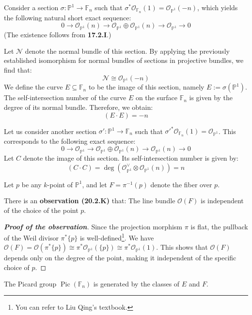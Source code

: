 Consider a section $\sigma: \mathbb{P}^1 \to \mathbb{F}_n$ such that $\sigma^*\mathcal{O}_{\mathbb{F}_n}(1) = \mathcal{O}_{\mathbb{P}^1}(-n)$, which yields the following natural short exact sequence:
\[
0 \to \mathcal{O}_{\mathbb{P}^1}(n) \to \mathcal{O}_{\mathbb{P}^1} \oplus \mathcal{O}_{\mathbb{P}^1}(n) \to \mathcal{O}_{\mathbb{P}^1} \to 0
\]
(The existence follows from \textbf{17.2.I}.)

Let $\mathcal{N}$ denote the normal bundle of this section. By applying the previously established isomorphism for normal bundles of sections in projective bundles, we find that:
\[
\mathcal{N} \cong \mathcal{O}_{\mathbb{P}^1}(-n)
\]
We define the curve $E \subseteq \mathbb{F}_n$ to be the image of this section, namely $E := \sigma(\mathbb{P}^1)$. The self-intersection number of the curve $E$ on the surface $\mathbb{F}_n$ is given by the degree of its normal bundle. Therefore, we obtain:
\[
(E \cdot E) = -n
\]

Let us consider another section $\sigma': \mathbb{P}^1 \to \mathbb{F}_n$ such that $\sigma'^*\mathcal{O}_{\mathbb{F}_n}(1) = \mathcal{O}_{\mathbb{P}^1}$. This corresponds to the following exact sequence:
\[
0 \to \mathcal{O}_{\mathbb{P}^1} \to \mathcal{O}_{\mathbb{P}^1} \oplus \mathcal{O}_{\mathbb{P}^1}(n) \to \mathcal{O}_{\mathbb{P}^1}(n) \to 0
\]
Let $C$ denote the image of this section. Its self-intersection number is given by:
\[
(C \cdot C) = \deg(\mathcal{O}_{\mathbb{P}^1}^\vee \otimes \mathcal{O}_{\mathbb{P}^1}(n)) = n
\]

Let $p$ be any $k$-point of $\mathbb{P}^1$, and let $F = \pi^{-1}(p)$ denote the fiber over $p$.



There is an \textbf{observation (20.2.K)} that:
The line bundle $\mathcal{O}(F)$ is independent of the choice of the point $p$.

\begin{proof}[\textbf{Proof of the observation}]
    Since the projection morphism $\pi$ is flat, 
    the pullback of the Weil divisor $\pi^*\{p\}$ is well-defined\footnote{You can refer to Liu Qing's textbook.}. 
    We have $\mathcal{O}(F) = \mathcal{O}(\pi^*\{p\}) \cong \pi^*\mathcal{O}_{\mathbb{P}^1}(\{p\}) \cong \pi^*\mathcal{O}_{\mathbb{P}^1}(1)$. This shows that $\mathcal{O}(F)$ depends only on the degree of the point, making it independent of the specific choice of $p$.
\end{proof}

\begin{proposition}[20.2.L]
The Picard group $\operatorname{Pic}(\mathbb{F}_n)$ is generated by the classes of $E$ and $F$.
\end{proposition}


